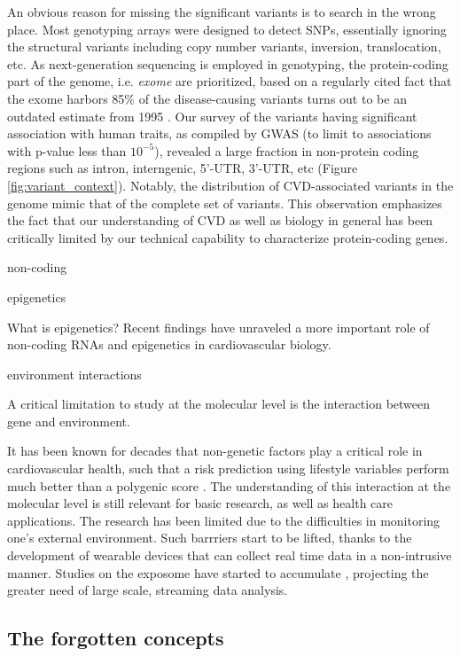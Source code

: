 \documentclass[letter]{bioinfo}
\begin{document}
An obvious reason for missing the significant variants is to search in the wrong place. Most genotyping arrays were designed to detect SNPs, essentially ignoring the structural variants including copy number variants, inversion, translocation, etc. As next-generation sequencing is employed in genotyping, the protein-coding part of the genome, i.e. \textit{exome} are prioritized, based on a regularly cited fact that the exome harbors 85\% of the disease-causing variants turns out to be an outdated estimate from 1995 \citep{Antonarakis:2001:nature}. Our survey of the variants having significant association with human traits, as compiled by GWAS (to limit to associations with p-value less than $10^{-5}$), revealed a large fraction in non-protein coding regions such as intron, interngenic, 5'-UTR, 3'-UTR, etc (Figure \ref{fig:variant_context}). Notably, the distribution of CVD-associated variants in the genome mimic that of the complete set of variants. This observation emphasizes the fact that our understanding of CVD as well as biology in general has been critically limited by our technical capability to characterize protein-coding genes. 


non-coding

epigenetics

What is epigenetics? 
Recent findings have unraveled a more important role of non-coding RNAs and epigenetics in cardiovascular biology.

environment interactions

A critical limitation to study at the molecular level is the interaction between gene  and environment.

It has been known for decades that non-genetic factors play a critical role in cardiovascular health, such that a risk prediction using lifestyle variables perform much better than a polygenic score \citep{Joyner:2011:Ten}. The understanding of this interaction at the molecular level is still relevant for basic research, as well as health care applications. The research has been limited due to the difficulties in monitoring one's external environment. Such barrriers start to be lifted, thanks to the development of wearable devices that can collect real time data in a non-intrusive manner. Studies on the exposome have started to accumulate \citep{Jiang:2018:Dynamic}, projecting the greater need of large scale, streaming data analysis.


\subsection{The forgotten concepts}
\end{document}
